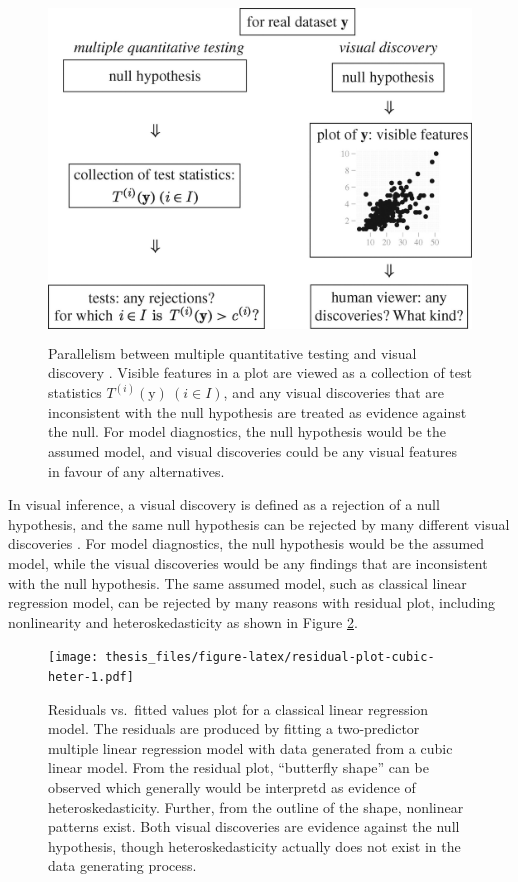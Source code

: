 \documentclass{monashthesis}
\theoremstyle{definition}
\theoremstyle{definition}
\theoremstyle{definition}
\theoremstyle{definition}
\theoremstyle{remark}
\begin{document}
\begin{figure}
\centering
\includegraphics[width=4.6875in,height=3.55208in]{figures/rsta2009012001.jpg}
\caption{Parallelism between multiple quantitative testing and visual discovery \autocite{buja_statistical_2009}. Visible features in a plot are viewed as a collection of test statistics \(T^{(i)}(\boldsymbol{\mathrm{y}})~(i \in I)\), and any visual discoveries that are inconsistent with the null hypothesis are treated as evidence against the null. For model diagnostics, the null hypothesis would be the assumed model, and visual discoveries could be any visual features in favour of any alternatives. \label{fig:parallelism}}
\end{figure}



In visual inference, a visual discovery is defined as a rejection of a null hypothesis, and the same null hypothesis can be rejected by many different visual discoveries \autocite{buja_statistical_2009}. For model diagnostics, the null hypothesis would be the assumed model, while the visual discoveries would be any findings that are inconsistent with the null hypothesis. The same assumed model, such as classical linear regression model, can be rejected by many reasons with residual plot, including nonlinearity and heteroskedasticity as shown in Figure \ref{fig:residual-plot-cubic-heter}.

\begin{figure}
\centering
\texttt{[image: thesis\_files/figure-latex/residual-plot-cubic-heter-1.pdf]}
\caption{\label{fig:residual-plot-cubic-heter}Residuals vs.~fitted values plot for a classical linear regression model. The residuals are produced by fitting a two-predictor multiple linear regression model with data generated from a cubic linear model. From the residual plot, ``butterfly shape'' can be observed which generally would be interpretd as evidence of heteroskedasticity. Further, from the outline of the shape, nonlinear patterns exist. Both visual discoveries are evidence against the null hypothesis, though heteroskedasticity actually does not exist in the data generating process.}
\end{figure}
\end{document}
